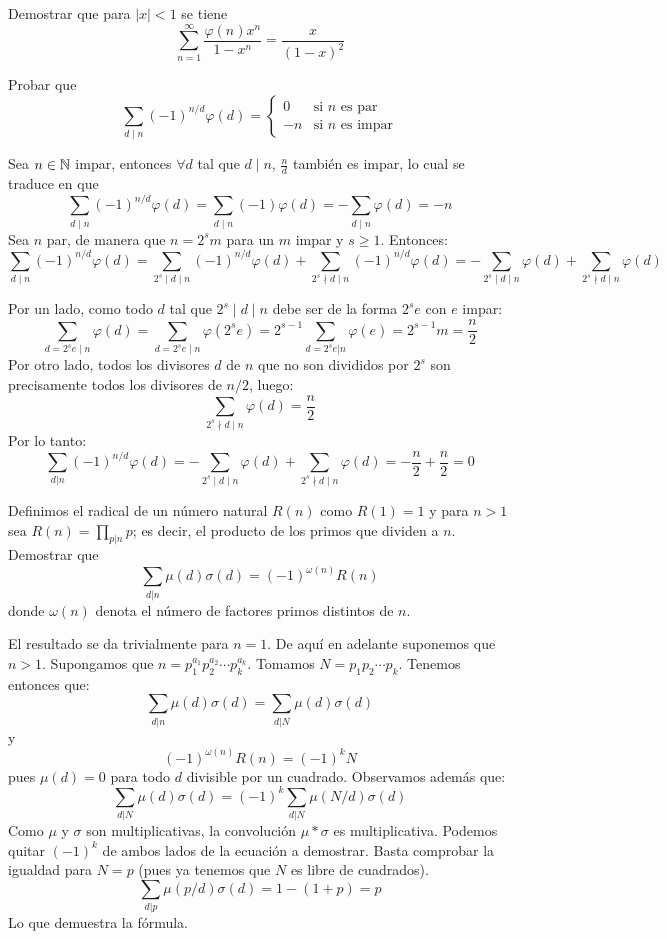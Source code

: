 \documentclass[twoside]{article}
\begin{document}
\newpage

\begin{ejercicio}{12}
Demostrar que para $|x| < 1$ se tiene
\[ \sum_{n=1}^{∞} \frac{φ(n) x^n}{1-x^n} = \frac{x}{(1-x)^2} \]
\end{ejercicio}
\begin{solucion}
\end{solucion}

\newpage

\begin{ejercicio}{13}
Probar que	
\[
\sum_{d\mid n} (-1)^{n/d}\varphi(d) = 
\begin{cases}
0 & \text{si $n$ es par}\\ 
-n & \text{si $n$ es impar}
\end{cases}
\]
\begin{sol}
Sea $n \in \mathbb{N}$ impar, entonces $\forall d$ tal que $d \mid n$, $\frac{n}{d}$ también es impar, lo cual se traduce en que
\[
\sum_{d\mid n} (-1)^{n/d}\varphi(d) = \sum_{d\mid n} (-1)\varphi(d) = -\sum_{d\mid n}\varphi(d) = -n
\]
Sea $n$ par, de manera que $n=2^sm$ para un $m$ impar y $s ≥ 1$. Entonces:
\[ \sum_{d\mid n}(-1)^{n/d}φ(d) =  \sum_{2^s\mid d \mid n}(-1)^{n/d}φ(d) +  \sum_{2^s\nmid d \mid n}(-1)^{n/d}φ(d) = -\sum_{2^s\mid d \mid n}φ(d) + \sum_{2^s\nmid d \mid n}φ(d) \]

Por un lado, como todo $d$ tal que $2^s\mid d \mid n$ debe ser de la forma $2^se$ con $e$ impar:
\[ \sum_{d=2^se \mid n} φ(d) = \sum_{d=2^se \mid n} φ(2^se) = 2^{s-1}\sum_{d=2^se|n} φ(e) = 2^{s-1}m = \frac{n}{2}\]
Por otro lado, todos los divisores $d$ de $n$ que no son divididos por $2^s$ son precisamente todos los divisores de $n/2$, luego:
\[ \sum_{2^s\nmid d \mid n}φ(d) = \frac{n}{2} \]
Por lo tanto:
\[ \sum_{d|n} (-1)^{n/d}φ(d) = -\sum_{2^s\mid d\mid n}φ(d)+\sum_{2^s\nmid d\mid n}φ(d) = -\frac{n}{2}+\frac{n}{2}=0\]
\end{sol}

\newpage

\begin{ejercicio}{14}
Definimos el radical de un número natural $R(n)$ como $R(1) = 1$ y para $n > 1$ sea $R(n) = \prod_{p|n} p$; es decir, el producto de los primos que dividen a $n$. Demostrar que
\[ \sum_{d|n} μ(d) σ(d) = (-1)^{ω(n)} R(n) \]
donde $ω(n)$ denota el número de factores primos distintos de $n$.
\end{ejercicio}
\begin{solucion}
El resultado se da trivialmente para $n=1$. De aquí en adelante suponemos que $n>1$.
Supongamos que $n=p_1^{a_1}p_2^{a_2}\cdots p_k^{a_k}$. Tomamos $N=p_1p_2\cdots p_k$. Tenemos entonces que:
\[ \sum_{d|n} μ(d) σ(d) = \sum_{d|N} μ(d) σ(d) \]
y
\[ (-1)^{ω(n)} R(n) = (-1)^k N \]
pues $μ(d)=0$ para todo $d$ divisible por un cuadrado.
Observamos además que:
\[ \sum_{d|N} μ(d) σ(d) = (-1)^k\sum_{d|N} μ(N/d) σ(d) \]
Como $μ$ y $σ$ son multiplicativas, la convolución $μ * σ$ es multiplicativa. Podemos quitar $(-1)^{k}$ de ambos lados de la ecuación a demostrar. Basta comprobar la igualdad para $N=p$ (pues ya tenemos que $N$ es libre de cuadrados).
\[ \sum_{d|p} μ(p/d) σ(d) = 1-(1+p) = p \]
Lo que demuestra la fórmula.
\end{solucion}


\end{ejercicio}
\end{document}
